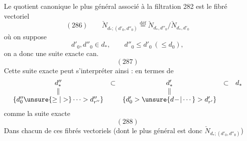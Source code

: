 Le quotient canonique le plus général associé à la filtration 282 est le fibré vectoriel
\[
(286)\qquad\check N_{d_*;(d'_0,d''_0)}\overset{\mathrm{déf}}=\check N_{d_*,d''_0}/\check N_{d_*,d'_0}
\]
où on suppose
\[
d'_0,d''_0\in d_*,\qquad d''_0\leq d'_0\ (\leq d_0),
\]
on a donc une suite exacte can.
\[
(287)
\]
Cette suite exacte peut s'interpréter ainsi : en termes de
\[
\begin{array}{ccccc}
d''_*&\subset&d'_*&\subset&d_*\\
\Vert&&\Vert&&\\
\{d''_0\unsure{\geq|>}\cdots>d''_{r''}\}&&\{d'_0>\unsure{d\!-\!|\cdots}>d'_{r'}\}&&
\end{array}
\]
comme la suite exacte
\[
(288)
\]
Dans chacun de ces fibrés vectoriels  (dont le plus général est donc $\check N_{d_*;(d'_0,d''_0)}$)

